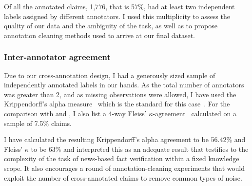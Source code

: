 \begin{table}[H]
    \caption{Label distribution in \CTK splits before and after cleaning. Reprinted from~\cite{lrev}}
    \label{tab:ctkfacts}
    \end{table}

Of all the annotated claims, 1,776, that is 57\%, had at least two independent labels assigned by different annotators.
I used this multiplicity to assess the quality of our data and the ambiguity of the task, as well as to propose annotation cleaning methods used to arrive at our final  \CTK dataset.

\subsubsection{Inter-annotator agreement}
\label{sec:agreement}

Due to our cross-annotation design, I had a generously sized sample of independently annotated labels in our hands.
As the total number of annotators was greater than 2, and as missing observations were allowed, I have used the Krippendorff's alpha measure~\cite{krippendorff1970} which is the standard for this case~\cite{hayes2007krippendorff}.
For the comparison with \cite{fever} and \cite{norregaard2021danfever}, I also list a 4-way Fleiss' $\kappa$-agreement~\cite{fleiss1971measuring} calculated on a sample of 7.5\% claims.

I have calculated the resulting Krippendorff's alpha agreement to be 56.42\% and Fleiss' $\kappa$ to be 63\% and interpreted this as an adequate result that testifies to the complexity of the task of news-based fact verification within a fixed knowledge scope.
It also encourages a round of annotation-cleaning experiments that would exploit the number of cross-annotated claims to remove common types of noise.

